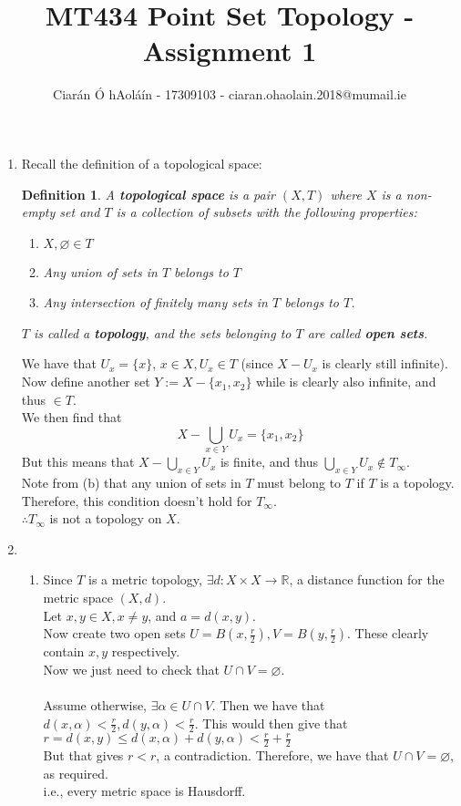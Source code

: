 \documentclass{article}
\title{MT434 Point Set Topology - Assignment 1}
\author{Ciarán Ó hAoláín - 17309103 - ciaran.ohaolain.2018@mumail.ie}
\newcommand{\R}{\mathbb{R}}
\renewcommand{\emptyset}{\varnothing}
\newtheorem{sdefinition}[stheorem]{Definition}
\theoremstyle{remark}
\theoremstyle{example}
\theoremstyle{examples}
\begin{document}
	\maketitle
	\begin{enumerate}
		\item Recall the definition of a topological space:
		\addtocounter{section}{2}
		\addtocounter{theorem}{1}
		\begin{framed}
			\begin{sdefinition}
				\label{topologicalspace}
				A \textbf{topological space} is a pair $(X,T)$ where $X$ is a non-empty set and $T$ is a collection of subsets with the following properties:
				\begin{enumerate}
					\item $X, \emptyset \in T$
					\item Any union of sets in $T$ belongs to $T$
					\item Any intersection of finitely many sets in $T$ belongs to $T$.
				\end{enumerate}
				$T$ is called a \textbf{topology}, and the sets belonging to $T$ are called \textbf{open sets}.
			\end{sdefinition}
		\end{framed}
		
		We have that $U_x=\{x\}$, $x \in X, U_x \in T$ (since $X - U_x$ is clearly still infinite).\\
		Now define another set $Y:=X-\{x_1, x_2\}$ while is clearly also infinite, and thus $\in T$.	\\
		We then find that \[X - \bigcup_{x \in Y} U_x = \{x_1, x_2\}\]
		But this means that $X - \bigcup_{x \in Y} U_x$ is finite, and thus $\bigcup_{x \in Y} U_x \notin T_\infty$.\\
		Note from (b) that any union of sets in $T$ must belong to $T$ if $T$ is a topology.\\
		Therefore, this condition doesn't hold for $T_\infty$.\\
		$\therefore T_\infty$ is not a topology on $X$.
		\item \begin{enumerate}
			\item Since $T$ is a metric topology, $\exists d:X \times X \to \R$, a distance function for the metric space $(X,d)$.\\
			Let $x,y \in X, x \neq y$, and $a = d(x,y)$.\\
			Now create two open sets $U=B(x,\frac{r}{2}), V=B(y,\frac{r}{2})$. These clearly contain $x,y$ respectively.\\
			Now we just need to check that $U \cap V = \emptyset$.\\
			\\
			Assume otherwise, $\exists \alpha \in U \cap V$. Then we have that $d(x,\alpha) < \frac{r}{2}, d(y, \alpha) < \frac{r}{2}$. This would then give that $r=d(x,y) \leq d(x,\alpha) + d(y,\alpha) < \frac{r}{2} + \frac{r}{2}$\\
			But that gives $r < r$, a contradiction. Therefore, we have that $U \cap V  =\emptyset$, as required.\\
			i.e., every metric space is Hausdorff.
			

\end{enumerate}
\end{enumerate}
\end{document}
